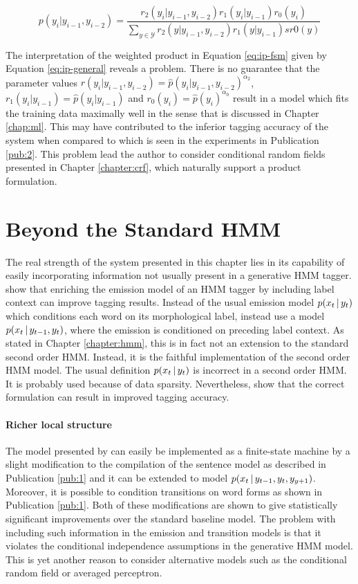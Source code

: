 \begin{equation}
p(y_i|y_{i-1}, y_{i-2}) = \frac{r_2(y_i|y_{i-1},y_{i-2})r_1(y_i|y_{i-1})r_0(y_i)}{\sum_{y\in\mathcal{Y}} r_2(y|y_{i-1},y_{i-2})r_1(y|y_{i-1})sr0(y)}\label{eq:ip-general}
\end{equation}

The interpretation of the weighted product in Equation \ref{eq:ip-fsm}
given by Equation \ref{eq:ip-general} reveals a problem. There is no
guarantee that the parameter values $r(y_i|y_{i-1},y_{i-2}) =
\hat{p}(y_i|y_{i-1},y_{i-2})^{\alpha_2}$, $r_1(y_i|y_{i-1}) =
\hat{p}(y_i|y_{i-1})$ and $r_0(y_i) = \hat{p}(y_i)^{\alpha_0}$ result
in a model which fits the training data maximally well in the sense
that is discussed in Chapter \ref{chap:ml}. This may have contributed
to the inferior tagging accuracy of the system when compared to
\cite{Brants2000} which is seen in the experiments in Publication
\ref{pub:2}. This problem lead the
author to consider conditional random fields presented in Chapter
\ref{chapter:crf}, which naturally support a product formulation.

\section{Beyond the Standard HMM}\label{sec:enriched}

The real strength of the system presented in this chapter lies in its
capability of easily incorporating information not usually present in
a generative HMM tagger. \cite{Halacsy2007} show that enriching the
emission model of an HMM tagger by including label context can improve
tagging results. Instead of the usual emission model $p(x_t\mbox{$ \, | \, $} y_t)$
which conditions each word on its morphological label,
\cite{Halacsy2007} instead use a model $p(x_t\mbox{$ \, | \, $} y_{t-1},y_t)$,
where the emission is conditioned on preceding label context. As
stated in Chapter \ref{chapter:hmm}, this is in fact not an extension
to the standard second order HMM. Instead, it is the faithful
implementation of the second order HMM model. The usual definition
$p(x_t\mbox{$ \, | \, $} y_t)$ is incorrect in a second order HMM. It is probably
used because of data sparsity. Nevertheless, \cite{Halacsy2007} show
that the correct formulation can result in improved tagging accuracy.

\paragraph{Richer local structure} The model presented by
\cite{Halascy2007} can easily be implemented as a finite-state machine
by a slight modification to the compilation of the sentence model as
described in Publication \ref{pub:1} and it can be extended to model
$p(x_t\mbox{$ \, | \, $} y_{t-1}, y_t, y_{y+1})$. Moreover, it is possible to
condition transitions on word forms as shown in Publication
\ref{pub:1}. Both of these modifications are shown to give
statistically significant improvements over the standard baseline
model. The problem with including such information in the emission and
transition models is that it violates the conditional independence
assumptions in the generative HMM model. This is yet another reason to
consider alternative models such as the conditional random field or
averaged perceptron.

